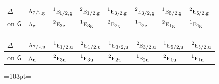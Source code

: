 \documentclass[10pt,a4paper]{article}
\newcommand{\needspace}[1]{\par\penalty-100\begingroup\dimen0=#1\relax\dimen2=\pagegoal
  \advance\dimen2-\pagetotal\ifdim\dimen0>\dimen2\relax\ifdim\dimen2>0pt\vfil\break\fi\fi
  \endgroup}
\numberwithin{equation}{section}
\newcommand{\grp}[1]{\mathsf{#1}}
\newcommand{\irr}[1]{\text{\normalfont\scshape #1}}
\newcommand{\conjpair}[1]{{}^{#1}}
\newcommand{\ptag}[1]{\mathrm{#1}}
\begin{document}
\begin{center}\begin{tabular}{@{}llllllll@{}}\toprule
$\Delta$ & $\irr{a}_{7/2,\ptag{g}}$ & $\conjpair{1}\irr{e}_{1/2,\ptag{g}}$ & $\conjpair{2}\irr{e}_{1/2,\ptag{g}}$ & $\conjpair{1}\irr{e}_{3/2,\ptag{g}}$ & $\conjpair{2}\irr{e}_{3/2,\ptag{g}}$ & $\conjpair{1}\irr{e}_{5/2,\ptag{g}}$ & $\conjpair{2}\irr{e}_{5/2,\ptag{g}}$\\\midrule
on $\grp{G}$ & $\irr{a}_{\ptag{g}}$ & $\conjpair{2}\irr{e}_{3\ptag{g}}$ & $\conjpair{1}\irr{e}_{3\ptag{g}}$ & $\conjpair{2}\irr{e}_{2\ptag{g}}$ & $\conjpair{1}\irr{e}_{2\ptag{g}}$ & $\conjpair{2}\irr{e}_{1\ptag{g}}$ & $\conjpair{1}\irr{e}_{1\ptag{g}}$\\
\bottomrule\end{tabular}\end{center}
\begin{center}\begin{tabular}{@{}llllllll@{}}\toprule
$\Delta$ & $\irr{a}_{7/2,\ptag{u}}$ & $\conjpair{1}\irr{e}_{1/2,\ptag{u}}$ & $\conjpair{2}\irr{e}_{1/2,\ptag{u}}$ & $\conjpair{1}\irr{e}_{3/2,\ptag{u}}$ & $\conjpair{2}\irr{e}_{3/2,\ptag{u}}$ & $\conjpair{1}\irr{e}_{5/2,\ptag{u}}$ & $\conjpair{2}\irr{e}_{5/2,\ptag{u}}$\\\midrule
on $\grp{G}$ & $\irr{a}_{\ptag{u}}$ & $\conjpair{2}\irr{e}_{3\ptag{u}}$ & $\conjpair{1}\irr{e}_{3\ptag{u}}$ & $\conjpair{2}\irr{e}_{2\ptag{u}}$ & $\conjpair{1}\irr{e}_{2\ptag{u}}$ & $\conjpair{2}\irr{e}_{1\ptag{u}}$ & $\conjpair{1}\irr{e}_{1\ptag{u}}$\\
\bottomrule\end{tabular}\end{center}
\needspace{103pt}
\end{document}

